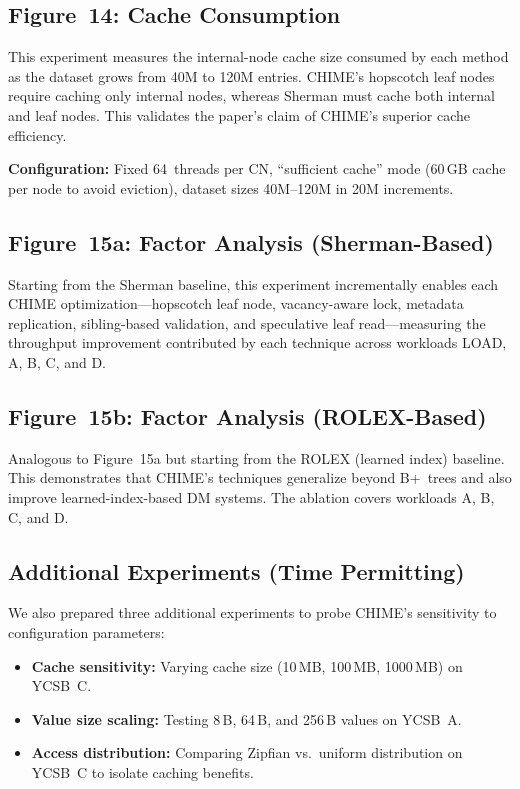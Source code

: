 \documentclass[11pt,a4paper]{article}
\begin{document}
\subsection{Figure~14: Cache Consumption}

This experiment measures the internal-node cache size consumed by each method as the dataset grows from 40M to 120M entries. CHIME's hopscotch leaf nodes require caching only internal nodes, whereas Sherman must cache both internal and leaf nodes. This validates the paper's claim of CHIME's superior cache efficiency.

\textbf{Configuration:} Fixed 64~threads per CN, ``sufficient cache'' mode (60\,GB cache per node to avoid eviction), dataset sizes 40M--120M in 20M increments.

\subsection{Figure~15a: Factor Analysis (Sherman-Based)}

Starting from the Sherman baseline, this experiment incrementally enables each CHIME optimization---hopscotch leaf node, vacancy-aware lock, metadata replication, sibling-based validation, and speculative leaf read---measuring the throughput improvement contributed by each technique across workloads LOAD, A, B, C, and D.

\subsection{Figure~15b: Factor Analysis (ROLEX-Based)}

Analogous to Figure~15a but starting from the ROLEX (learned index) baseline. This demonstrates that CHIME's techniques generalize beyond B+~trees and also improve learned-index-based DM systems. The ablation covers workloads A, B, C, and D.

\subsection{Additional Experiments (Time Permitting)}

We also prepared three additional experiments to probe CHIME's sensitivity to configuration parameters:
\begin{itemize}[nosep]
    \item \textbf{Cache sensitivity:} Varying cache size (10\,MB, 100\,MB, 1000\,MB) on YCSB~C.
    \item \textbf{Value size scaling:} Testing 8\,B, 64\,B, and 256\,B values on YCSB~A.
    \item \textbf{Access distribution:} Comparing Zipfian vs.\ uniform distribution on YCSB~C to isolate caching benefits.
\end{itemize}
\end{document}
